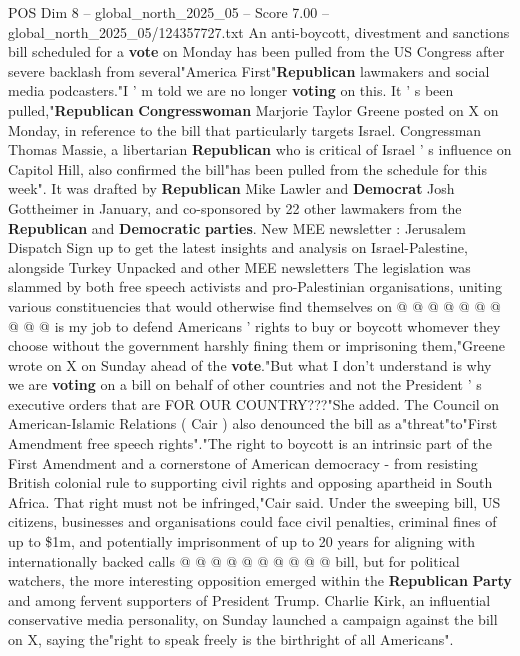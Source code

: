 \begin{textsample}{POS Dim 8 – global\_north\_2025\_05 – Score 7.00 – global\_north\_2025\_05/124357727.txt}  \label{ex:f8_pos_402}
An anti-boycott, divestment and sanctions bill scheduled for a \textbf{vote} on Monday has been pulled from the US Congress after severe backlash from several"America First"\textbf{Republican} lawmakers and social media podcasters."I ' m told we are no longer \textbf{voting} on this.
It ' s been pulled,"\textbf{Republican} \textbf{Congresswoman} Marjorie Taylor Greene posted on X on Monday, in reference to the bill that particularly targets Israel.
Congressman Thomas Massie, a libertarian \textbf{Republican} who is critical of Israel ' s influence on Capitol Hill, also confirmed the bill"has been pulled from the schedule for this week".
It was drafted by \textbf{Republican} Mike Lawler and \textbf{Democrat} Josh Gottheimer in January, and co-sponsored by 22 other lawmakers from the \textbf{Republican} and \textbf{Democratic} \textbf{parties}.
New MEE newsletter : Jerusalem Dispatch Sign up to get the latest insights and analysis on Israel-Palestine, alongside Turkey Unpacked and other MEE newsletters The legislation was slammed by both free speech activists and pro-Palestinian organisations, uniting various constituencies that would otherwise find themselves on @ @ @ @ @ @ @ @ @ @ is my job to defend Americans ' rights to buy or boycott whomever they choose without the government harshly fining them or imprisoning them,"Greene wrote on X on Sunday ahead of the \textbf{vote}."But what I don't understand is why we are \textbf{voting} on a bill on behalf of other countries and not the President ' s executive orders that are FOR OUR COUNTRY???"She added.
The Council on American-Islamic Relations ( Cair ) also denounced the bill as a"threat"to"First Amendment free speech rights"."The right to boycott is an intrinsic part of the First Amendment and a cornerstone of American democracy - from resisting British colonial rule to supporting civil rights and opposing apartheid in South Africa.
That right must not be infringed,"Cair said.
Under the sweeping bill, US citizens, businesses and organisations could face civil penalties, criminal fines of up to \$1m, and potentially imprisonment of up to 20 years for aligning with internationally backed calls @ @ @ @ @ @ @ @ @ @ bill, but for political watchers, the more interesting opposition emerged within the \textbf{Republican} \textbf{Party} and among fervent supporters of President Trump.
Charlie Kirk, an influential conservative media personality, on Sunday launched a campaign against the bill on X, saying the"right to speak freely is the birthright of all Americans".

\end{textsample}
